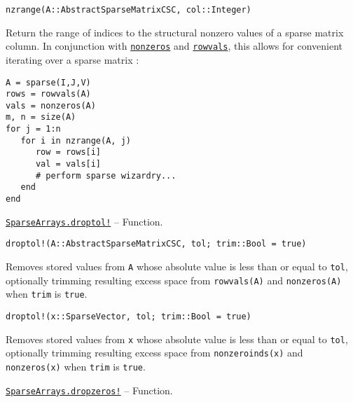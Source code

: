 \begin{adjustwidth}{2em}{0pt}


\begin{verbatim}
nzrange(A::AbstractSparseMatrixCSC, col::Integer)
\end{verbatim}

Return the range of indices to the structural nonzero values of a sparse matrix column. In conjunction with \hyperlink{2553509978651134823}{\texttt{nonzeros}} and \hyperlink{11529930160190690800}{\texttt{rowvals}}, this allows for convenient iterating over a sparse matrix :


\begin{lstlisting}
A = sparse(I,J,V)
rows = rowvals(A)
vals = nonzeros(A)
m, n = size(A)
for j = 1:n
   for i in nzrange(A, j)
      row = rows[i]
      val = vals[i]
      # perform sparse wizardry...
   end
end
\end{lstlisting}



\end{adjustwidth}
\hypertarget{10473482629417875992}{} 
\hyperlink{10473482629417875992}{\texttt{SparseArrays.droptol!}}  -- {Function.}

\begin{adjustwidth}{2em}{0pt}


\begin{verbatim}
droptol!(A::AbstractSparseMatrixCSC, tol; trim::Bool = true)
\end{verbatim}

Removes stored values from \texttt{A} whose absolute value is less than or equal to \texttt{tol}, optionally trimming resulting excess space from \texttt{rowvals(A)} and \texttt{nonzeros(A)} when \texttt{trim} is \texttt{true}.




\begin{lstlisting}
droptol!(x::SparseVector, tol; trim::Bool = true)
\end{lstlisting}

Removes stored values from \texttt{x} whose absolute value is less than or equal to \texttt{tol}, optionally trimming resulting excess space from \texttt{nonzeroinds(x)} and \texttt{nonzeros(x)} when \texttt{trim} is \texttt{true}.



\end{adjustwidth}
\hypertarget{13132808383029320263}{} 
\hyperlink{13132808383029320263}{\texttt{SparseArrays.dropzeros!}}  -- {Function.}

